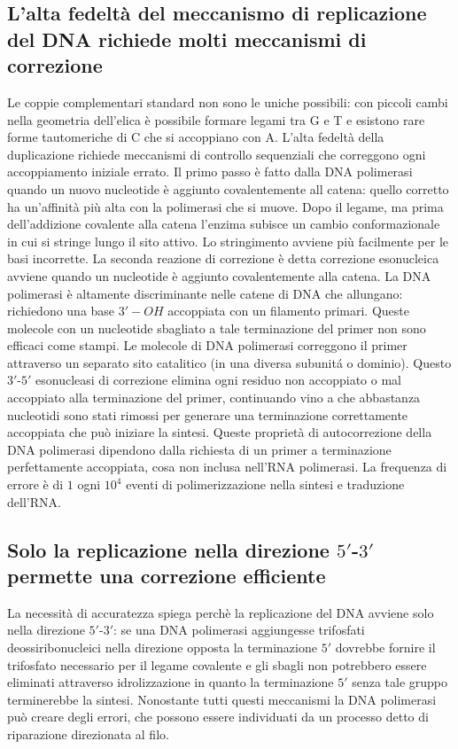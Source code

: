 \subsection{L'alta fedelt\`a del meccanismo di replicazione del DNA richiede molti meccanismi di correzione}
Le coppie complementari standard non sono le uniche possibili: con piccoli cambi nella geometria dell'elica \`e possibile formare legami tra G e T e esistono rare forme tautomeriche di C
che si accoppiano con A. L'alta fedelt\`a della duplicazione richiede meccanismi di controllo sequenziali che correggono ogni accoppiamento iniziale errato. Il primo passo \`e fatto 
dalla DNA polimerasi quando un nuovo nucleotide \`e aggiunto covalentemente all catena: quello corretto ha un'affinit\`a pi\`u alta con la polimerasi che si muove. Dopo il legame, ma
prima dell'addizione covalente alla catena l'enzima subisce un cambio conformazionale in cui si stringe lungo il sito attivo. Lo stringimento avviene pi\`u facilmente per le basi 
incorrette. La seconda reazione di correzione \`e detta correzione esonucleica avviene quando un nucleotide \`e aggiunto covalentemente alla catena. La DNA polimerasi \`e altamente 
discriminante nelle catene di DNA che allungano: richiedono una base $3'-OH$ accoppiata con un filamento primari. Queste molecole con un nucleotide sbagliato a tale terminazione del
primer non sono efficaci come stampi. Le molecole di DNA polimerasi correggono il primer attraverso un separato sito catalitico (in una diversa subunit\'a o dominio). Questo
$3'$-$5'$ esonucleasi di correzione elimina ogni residuo non accoppiato o mal accoppiato alla terminazione del primer, continuando vino a che abbastanza nucleotidi sono stati rimossi per
generare una terminazione correttamente accoppiata che pu\`o iniziare la sintesi. Queste propriet\`a di autocorrezione della DNA polimerasi dipendono dalla richiesta di un primer a 
terminazione perfettamente accoppiata, cosa non inclusa nell'RNA polimerasi. La frequenza di errore \`e di $1$ ogni $10^4$ eventi di polimerizzazione nella sintesi e traduzione dell'RNA.
\subsection{Solo la replicazione nella direzione $5'$-$3'$ permette una correzione efficiente}
La necessit\`a di accuratezza spiega perch\`e la replicazione del DNA avviene solo nella direzione $5'$-$3'$: se una DNA polimerasi aggiungesse trifosfati deossiribonucleici nella 
direzione opposta la terminazione $5'$ dovrebbe fornire il trifosfato necessario per il legame covalente e gli sbagli non potrebbero essere eliminati attraverso idrolizzazione in quanto
la terminazione $5'$ senza tale gruppo terminerebbe la sintesi. Nonostante tutti questi meccanismi la DNA polimerasi pu\`o creare degli errori, che possono essere individuati da un 
processo detto di riparazione direzionata al filo. 
